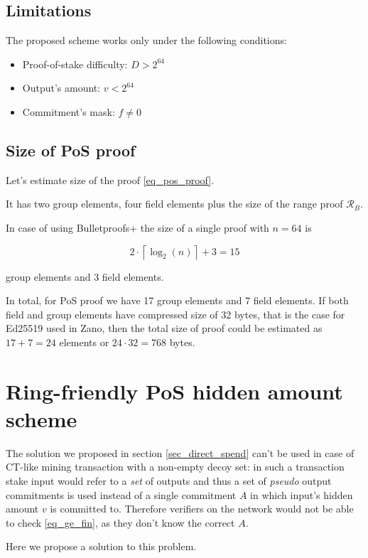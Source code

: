 \documentclass{article}
\newcommand{\ceil}[1]{\left\lceil #1 \right\rceil}
\numberwithin{figure}{section}
\begin{document}
\subsection{Limitations}

The proposed scheme works only under the following conditions:
\begin{itemize}
    \item Proof-of-stake difficulty: $D > 2^{64}$
    \item Output's amount: $v < 2^{64}$
    \item Commitment's mask: $f \neq 0$
\end{itemize}

\subsection{Size of PoS proof}

Let's estimate size of the proof \eqref{eq_pos_proof}.

It has two group elements, four field elements plus the size of the range proof $\mathcal{R}_B$.

In case of using Bulletproofs+ \cite{BP+} the size of a single proof with $n = 64$ is 

\[2 \cdot \ceil{\log_2(n)} + 3 = 15\]

group elements and 3 field elements.

In total, for PoS proof we have 17 group elements and 7 field elements. If both field and group elements have compressed size of 32 bytes, that is the case for Ed25519 used in Zano, then the total size of proof could be estimated as $17+7=24$ elements or $24 \cdot 32 = 768$ bytes.


\section{Ring-friendly PoS hidden amount scheme}

The solution we proposed in section \ref{sec_direct_spend} can't be used in case of CT-like mining transaction with a non-empty decoy set: in such a transaction stake input would refer to a \textit{set} of outputs and thus a set of \textit{pseudo} output commitments is used instead of a single commitment $A$ in which input's hidden amount $v$ is committed to. Therefore verifiers on the network would not be able to check \eqref{eq_ge_fin}, as they don't know the correct $A$. 

Here we propose a solution to this problem.
\end{document}
